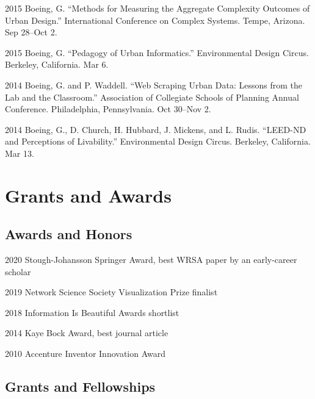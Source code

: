 \documentclass[12pt,letterpaper]{report}
\begin{document}
\begin{tablist}
        \item[2015] \tab Boeing, G. \enquote{Methods for Measuring the Aggregate Complexity Outcomes of Urban Design.} International Conference on Complex Systems. Tempe, Arizona. Sep 28--Oct 2.

        \item[2015] \tab Boeing, G. \enquote{Pedagogy of Urban Informatics.} Environmental Design Circus. Berkeley, California. Mar 6.

        \item[2014] \tab Boeing, G. and P. Waddell. \enquote{Web Scraping Urban Data: Lessons from the Lab and the Classroom.} Association of Collegiate Schools of Planning Annual Conference. Philadelphia, Pennsylvania. Oct 30--Nov 2.

        \item[2014] \tab Boeing, G., D. Church, H. Hubbard, J. Mickens, and L. Rudis. \enquote{LEED-ND and Perceptions of Livability.} Environmental Design Circus. Berkeley, California. Mar 13.

    \end{tablist}



    \section*{Grants and Awards}

    \subsection*{Awards and Honors}

    \begin{tablist}

        \item[2020] \tab Stough-Johansson Springer Award, best WRSA paper by an early-career scholar
        \item[2019] \tab Network Science Society Visualization Prize finalist
        \item[2018] \tab Information Is Beautiful Awards shortlist
        \item[2014] \tab Kaye Bock Award, best journal article
        \item[2010] \tab Accenture Inventor Innovation Award

    \end{tablist}

    \subsection*{Grants and Fellowships}
\end{document}
